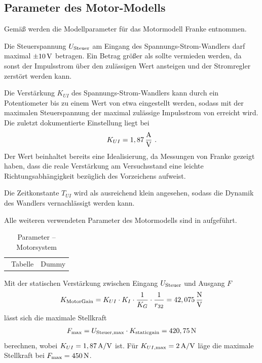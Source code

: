 \subsection{Parameter des Motor-Modells}\label{subsec:motorparams}

Gemäß  werden die Modellparameter für das Motormodell Franke \cite{franke} entnommen. 

Die Steuerspannung $U_{\mathrm{Steuer}}$ am Eingang des Spannungs-Strom-Wandlers darf maximal $\pm 10\,\mathrm{V}$ betragen. Ein Betrag größer als  sollte vermieden werden, da sonst der Impulsstrom über den zulässigen Wert ansteigen und der Stromregler zerstört werden kann.

Die Verstärkung $K_{UI}$ des Spannungs-Strom-Wandlers kann durch ein Potentiometer bis zu einem Wert von etwa  eingestellt werden, sodass mit der maximalen Steuerspannung der maximal zulässige Impulsstrom von  erreicht wird. Die zuletzt dokumentierte Einstellung liegt bei
\[
	K_{UI} = 1,87\,\mathrm{\frac{A}{V}} \ .
\]
Der Wert beinhaltet bereits eine Idealisierung, da Messungen von Franke \cite{franke} gezeigt haben, dass die reale Verstärkung am Versuchsstand eine leichte Richtungsabhängigkeit bezüglich des Vorzeichens aufweist.

Die Zeitkonstante $T_{UI}$ wird als ausreichend klein angesehen, sodass die Dynamik des Wandlers vernachlässigt werden kann.

Alle weiteren verwendeten Parameter des Motormodells sind in  aufgeführt.

\begin{table}[h]
	\centering
	\caption{Parameter -- Motorsystem}
		\begin{tabular}[t]{cc} \
					Tabelle & Dummy \\
		\end{tabular}
	\label{tab:motorparams}
\end{table}


Mit der statischen Verstärkung zwischen Eingang $U_{\mathrm{Steuer}}$ und Ausgang $F$
\begin{align}
	K_{\mathrm{MotorGain}} = K_{UI} \cdot K_I \cdot \frac{1}{K_G} \cdot \frac{1}{r_{32}} = 42,075\,\mathrm{\frac{N}{V}}
	\label{eq:motgain}
\end{align}
lässt sich die maximale Stellkraft
\begin{align}
	F_{\mathrm{max}} = U_{\mathrm{Steuer, max}} \cdot K_{\mathrm{staticgain}} = 420,75\,\mathrm{N}
\end{align}
berechnen, wobei $K_{UI} = 1,87\,\mathrm{A/V}$ ist.
Für $K_{UI \mathrm{, max}} = 2\,\mathrm{A/V}$ läge die maximale Stellkraft bei $F_{\mathrm{max}} = 450\,\mathrm{N}$.



